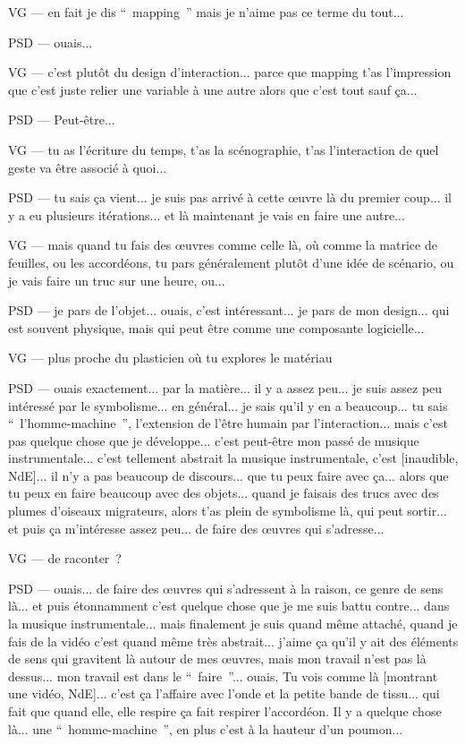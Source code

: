 VG — en fait je dis “ mapping ” mais je n'aime pas ce terme du tout...

PSD — ouais... 

VG — c'est plutôt du design d'interaction... parce que mapping t'as l'impression que c'est juste relier une variable à une autre alors que c'est tout sauf ça...

PSD — Peut-être...

VG — tu as l'écriture du temps, t'as la scénographie, t'as l'interaction de quel geste va être associé à quoi...

PSD — tu sais ça vient... je suis pas arrivé à cette œuvre là du premier coup... il y a eu plusieurs itérations... et là maintenant je vais en faire une autre...

VG — mais quand tu fais des œuvres comme celle là, où comme la matrice de feuilles, ou les accordéons, tu pars généralement plutôt d'une idée de scénario, ou je vais faire un truc sur une heure, ou...

PSD — je pars de l'objet... ouais, c'est intéressant... je pars de mon design... qui est souvent physique, mais qui peut être comme une composante logicielle...

VG — plus proche du plasticien où tu explores le matériau

PSD — ouais exactement... par la matière... il y a assez peu... je suis assez peu intéressé par le symbolisme... en général... je sais qu'il y en a beaucoup... tu sais “ l'homme-machine ”,  l'extension de l'être humain par l'interaction... mais c'est pas quelque chose que je développe... c'est peut-être mon passé de musique instrumentale... c'est tellement abstrait la musique instrumentale, c'est [inaudible, NdE]... il n'y a pas beaucoup de discours... que tu peux faire avec ça... alors que tu peux en faire beaucoup avec des objets... quand je faisais des trucs avec des plumes d'oiseaux migrateurs, alors t'as plein de symbolisme là, qui peut sortir... et puis ça m'intéresse assez peu... de faire des œuvres qui s'adresse...

VG — de raconter ?

PSD — ouais... de faire des œuvres qui s'adressent à la raison, ce genre de sens là... et puis étonnamment c'est quelque chose que je me suis battu contre... dans la musique instrumentale... mais finalement je suis quand même attaché, quand je fais de la vidéo c'est quand même très abstrait... j'aime ça qu'il y ait des éléments de sens qui gravitent là autour de mes œuvres, mais mon travail n'est pas là dessus... mon travail est dans le “ faire ”... ouais. Tu vois comme là [montrant une vidéo, NdE]... c'est ça l'affaire avec l'onde et la petite bande de tissu... qui fait que quand elle, elle respire ça fait respirer l'accordéon. Il y a quelque chose là... une “ homme-machine ”, en plus c'est à la hauteur d'un poumon...

